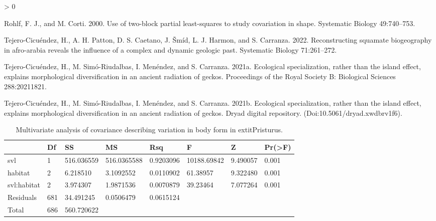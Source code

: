 \documentclass[
]{article}
\newlength{\cslhangindent}
\newenvironment{CSLReferences}[2] %
 {%
  \setlength{\parindent}{0pt}
  \ifodd #1 \everypar{\setlength{\hangindent}{\cslhangindent}}\ignorespaces\fi
  \ifnum #2 > 0
  \setlength{\parskip}{#2\baselineskip}
  \fi
 }%
 {}
\begin{document}
\begin{CSLReferences}{1}{0}
\leavevmode\hypertarget{ref-Rohlf2000}{}%
Rohlf, F. J., and M. Corti. 2000. Use of two-block partial least-squares
to study covariation in shape. Systematic Biology 49:740--753.

\leavevmode\hypertarget{ref-Tejero-Cicuendez2022}{}%
Tejero-Cicuéndez, H., A. H. Patton, D. S. Caetano, J. Šmíd, L. J.
Harmon, and S. Carranza. 2022. Reconstructing squamate biogeography in
afro-arabia reveals the influence of a complex and dynamic geologic
past. Systematic Biology 71:261--272.

\leavevmode\hypertarget{ref-Tejero-Cicuendez2021}{}%
Tejero-Cicuéndez, H., M. Simó-Riudalbas, I. Menéndez, and S. Carranza.
2021a. Ecological specialization, rather than the island effect,
explains morphological diversification in an ancient radiation of
geckos. Proceedings of the Royal Society B: Biological Sciences
288:20211821.

\leavevmode\hypertarget{ref-PristurusData}{}%
Tejero-Cicuéndez, H., M. Simó-Riudalbas, I. Menéndez, and S. Carranza.
2021b. Ecological specialization, rather than the island effect,
explains morphological diversification in an ancient radiation of
geckos. Dryad digital repository. (Doi:10.5061/dryad.xwdbrv1f6).

\end{CSLReferences}

\newpage

\begin{table}[H]

\caption{\label{tab:unnamed-chunk-1}Multivariate analysis of covariance describing variation in body form in    extit{Pristurus}.}
\centering
\begin{tabular}[t]{llllllll}
\toprule
  & Df & SS & MS & Rsq & F & Z & Pr(>F)\\
\midrule
svl & 1 & 516.036559 & 516.0365588 & 0.9203096 & 10188.69842 & 9.490057 & 0.001\\
habitat & 2 & 6.218510 & 3.1092552 & 0.0110902 & 61.38957 & 9.322480 & 0.001\\
svl:habitat & 2 & 3.974307 & 1.9871536 & 0.0070879 & 39.23464 & 7.077264 & 0.001\\
Residuals & 681 & 34.491245 & 0.0506479 & 0.0615124 &  &  & \\
Total & 686 & 560.720622 &  &  &  &  & \\
\bottomrule
\end{tabular}
\end{table}

\newpage
\end{document}
